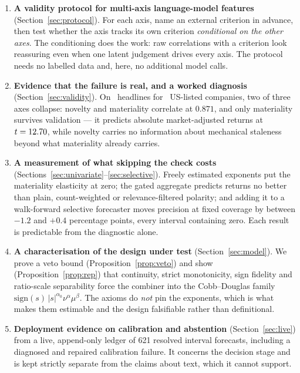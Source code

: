 \begin{enumerate}
\item \textbf{A validity protocol for multi-axis language-model features}
  (Section~\ref{sec:protocol}). For each axis, name an external criterion in
  advance, then test whether the axis tracks its own criterion \emph{conditional
  on the other axes}. The conditioning does the work: raw correlations with a
  criterion look reassuring even when one latent judgement drives every axis. The
  protocol needs no labelled data and, here, no additional model calls.
\item \textbf{Evidence that the failure is real, and a worked diagnosis}
  (Section~\ref{sec:validity}). On \ScoredHeadlines\ headlines for \NCompanies\
  US-listed companies, two of three axes collapse: novelty and materiality
  correlate at $0.871$, and only materiality survives validation --- it predicts
  absolute market-adjusted returns at $t=12.70$, while novelty carries no
  information about mechanical staleness beyond what materiality already carries.
\item \textbf{A measurement of what skipping the check costs}
  (Sections~\ref{sec:univariate}--\ref{sec:selective}). Freely estimated exponents
  put the materiality elasticity at zero; the gated aggregate predicts returns no
  better than plain, count-weighted or relevance-filtered polarity; and adding it
  to a walk-forward selective forecaster moves precision at fixed coverage by
  between $-1.2$ and $+0.4$ percentage points, every interval containing zero.
  Each result is predictable from the diagnostic alone.
\item \textbf{A characterisation of the design under test}
  (Section~\ref{sec:model}). We prove a veto bound (Proposition~\ref{prop:veto})
  and show (Proposition~\ref{prop:rep}) that continuity, strict monotonicity, sign
  fidelity and ratio-scale separability force the combiner into the Cobb--Douglas
  family $\mathrm{sign}(s)\,|s|^{\alpha_0}\nu^{\alpha}\mu^{\beta}$. The axioms do
  \emph{not} pin the exponents, which is what makes them estimable and the design
  falsifiable rather than definitional.
\item \textbf{Deployment evidence on calibration and abstention}
  (Section~\ref{sec:live}) from a live, append-only ledger of 621 resolved
  interval forecasts, including a diagnosed and repaired calibration failure. It
  concerns the decision stage and is kept strictly separate from the claims about
  text, which it cannot support.
\end{enumerate}

